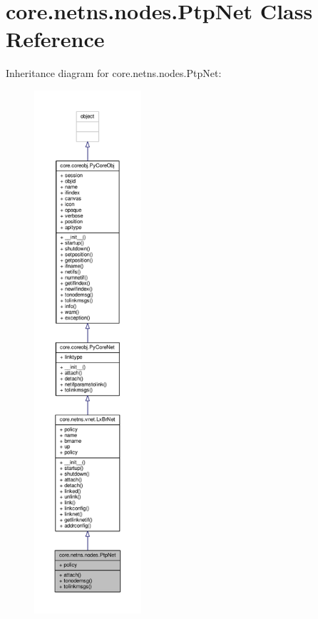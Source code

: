 \hypertarget{classcore_1_1netns_1_1nodes_1_1_ptp_net}{\section{core.\+netns.\+nodes.\+Ptp\+Net Class Reference}
\label{classcore_1_1netns_1_1nodes_1_1_ptp_net}
}


Inheritance diagram for core.\+netns.\+nodes.\+Ptp\+Net\+:
\nopagebreak
\begin{figure}[H]
\begin{center}
\leavevmode
\includegraphics[height=550pt]{classcore_1_1netns_1_1nodes_1_1_ptp_net__inherit__graph}
\end{center}
\end{figure}


